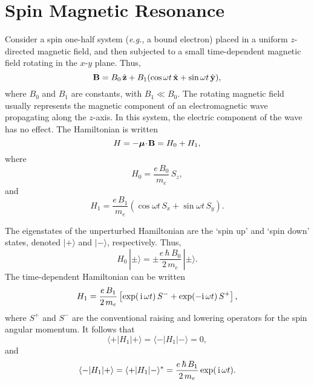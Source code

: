 \section{Spin Magnetic Resonance}
Consider a spin one-half system ({\em e.g.}, a bound electron) placed in a
uniform $z$-directed magnetic field, and then subjected to a small time-dependent magnetic field rotating in the $x$-$y$ plane. 
Thus,
\begin{equation}
{\bf B} = B_0\, \hat{\bf z} + B_1(\cos\omega t \,\hat{\bf x} + \sin\omega t
\,\hat{\bf y}),
\end{equation}
where $B_0$ and $B_1$ are constants, with $B_1\ll B_0$. The rotating magnetic
field usually  represents the magnetic component of an
electromagnetic wave propagating along the $z$-axis. In this system, the
electric component of the wave has no effect.
The Hamiltonian is written
\begin{equation}
H = - \mbox{\boldmath$\mu$}\! \cdot \! {\bf B} = H_0 + H_1,
\end{equation}
where
\begin{equation}
H_0 = \frac{e\,B_0}{m_e}\, S_z,
\end{equation}
and 
\begin{equation}
H_1 = \frac{e\, B_1}{m_e} \left(\cos\omega t \,S_x + \sin\omega t\, S_y\right).
\end{equation}

The eigenstates of the unperturbed Hamiltonian are the `spin up' and
`spin down' states, denoted $|+\rangle$ and $|-\rangle$, respectively.
Thus,
\begin{equation}
H_0 \,|\pm \rangle = \pm \frac{e\, \hbar\, B_0}{2 \,m_e} \,|\pm \rangle.
\end{equation}
The time-dependent Hamiltonian can be written
\begin{equation}
H_1 = \frac{e\, B_1}{2 \,m_e} \left[\exp(\,{\rm i}\,\omega t)\, S^- + 
\exp(-{\rm i}\,\omega t)\, S^+\right],
\end{equation}
where $S^+$ and $S^-$ are the conventional raising and lowering operators
for the spin angular momentum. It follows that
\begin{equation}
\langle + |H_1 |+\rangle = \langle - |H_1|-\rangle = 0,
\end{equation}
and
\begin{equation}
\langle - |H_1| + \rangle = \langle + |H_1| - \rangle^\ast = 
\frac{e \,\hbar \,B_1}{2\, m_e} \exp(\,{\rm i}\,\omega t).
\end{equation}

